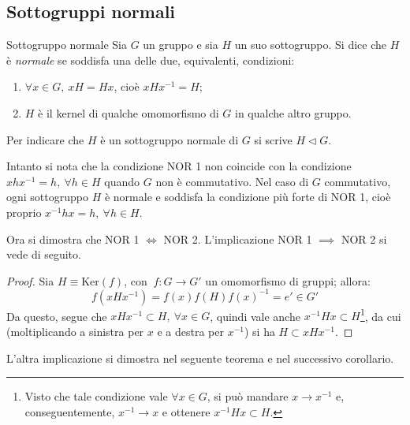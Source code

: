 \documentclass[11pt, a4paper]{scrartcl}
\theoremstyle{definition}
\numberwithin{esempio}{section}
\theoremstyle{definition}
\numberwithin{obs}{section}
\numberwithin{nota}{section}
\numberwithin{equation}{subsection}
\begin{document}
\subsection{Sottogruppi normali}
\begin{definizione}
	{Sottogruppo normale}{}
	Sia $G$ un gruppo e sia $H$ un suo sottogruppo. Si dice che $H $ \`e \textit{normale} se soddisfa una delle due, equivalenti, condizioni:
	\begin{enumerate}[NOR 1.]
		\item $\forall x \in G, \ xH = Hx$, cio\`e $xHx^{-1} = H$;
		\item $H$ \`e il kernel di qualche omomorfismo di $G$ in qualche altro gruppo.
	\end{enumerate}
	Per indicare che $H$ \`e un sottogruppo normale di $G$ si scrive $H \lhd G$.
\end{definizione}
\noindent Intanto si nota che la condizione NOR 1 non coincide con la condizione $x h x^{-1} = h, \ \forall h \in H$ quando $G$ non \`e commutativo.
Nel caso di $G$ commutativo, ogni sottogruppo $H$ \`e normale e soddisfa la condizione pi\`u forte di NOR 1, cio\`e proprio $x^{-1} h x = h, \ \forall h \in H$.

Ora si dimostra che NOR 1 $\iff$ NOR 2. L'implicazione NOR 1 $\implies$ NOR 2 si vede di seguito.
\begin{proof}
	Sia $H\equiv \mathrm{Ker} (f)$, con $ \ f: G \to G'$ un omomorfismo di gruppi; allora:
	\[
	f(xHx^{-1} ) = f(x) f(H) f(x) ^{-1} = e' \in G'
	\] 
	Da questo, segue che $x H x^{-1} \subset H, \ \forall x \in G$, quindi vale anche $x^{-1} H x \subset H$\footnote{Visto che tale condizione vale $\forall x \in G$, si pu\`o mandare $x\to x^{-1} $ e, conseguentemente, $x^{-1} \to x$ e ottenere $x^{-1} Hx \subset H$.}, da cui (moltiplicando a sinistra per $x$ e a destra per $x^{-1} $) si ha $H \subset x H x^{-1} $.
\end{proof}
L'altra implicazione si dimostra nel seguente teorema e nel successivo corollario.
\end{document}
